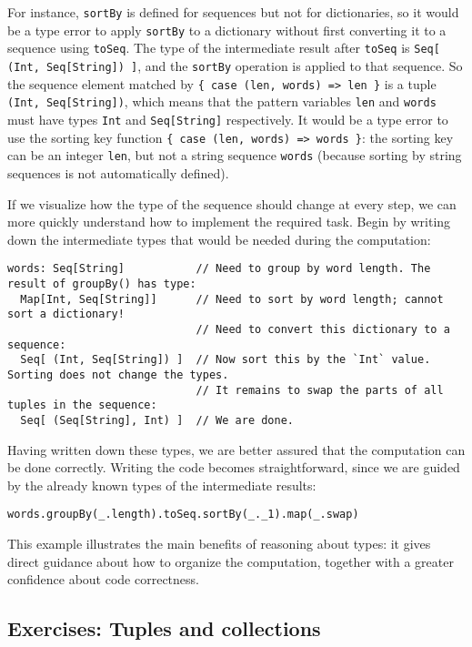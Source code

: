 For instance, \lstinline!sortBy! is defined for sequences but not
for dictionaries, so it would be a type error to
apply \lstinline!sortBy! to a dictionary without first converting
it to a sequence using \lstinline!toSeq!. The type of the intermediate
result after \lstinline!toSeq! is \lstinline!Seq[ (Int, Seq[String]) ]!,
and the \lstinline!sortBy! operation is applied to that sequence.
So the sequence element matched by \lstinline!{ case (len, words) => len }!
is a tuple \lstinline!(Int, Seq[String])!, which means that the pattern
variables \lstinline!len! and \lstinline!words! must have types
\lstinline!Int! and \lstinline!Seq[String]! respectively. It would
be a type error to use the sorting key function \lstinline!{ case (len, words) => words }!:
the sorting key can be an integer \lstinline!len!, but not a string
sequence \lstinline!words! (because sorting by string sequences is
not automatically defined).

If we visualize how the type of the sequence should change at every
step, we can more quickly understand how to implement the required
task. Begin by writing down the intermediate types that would be needed
during the computation:
\begin{lstlisting}
words: Seq[String]           // Need to group by word length. The result of groupBy() has type:
  Map[Int, Seq[String]]      // Need to sort by word length; cannot sort a dictionary!
                             // Need to convert this dictionary to a sequence:
  Seq[ (Int, Seq[String]) ]  // Now sort this by the `Int` value. Sorting does not change the types.
                             // It remains to swap the parts of all tuples in the sequence:
  Seq[ (Seq[String], Int) ]  // We are done.
\end{lstlisting}
Having written down these types, we are better assured that the computation
can be done correctly. Writing the code becomes straightforward, since
we are guided by the already known types of the intermediate results:
\begin{lstlisting}
words.groupBy(_.length).toSeq.sortBy(_._1).map(_.swap)
\end{lstlisting}

This example illustrates the main benefits of reasoning about types:
it gives direct guidance about how to organize the computation, together
with a greater confidence about code correctness.

\subsection{Exercises: Tuples and collections}

